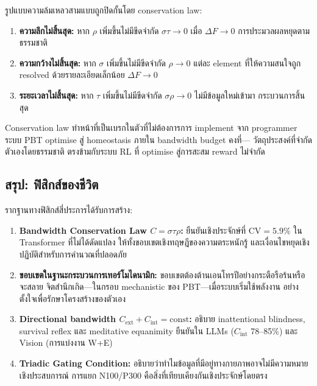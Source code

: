 \documentclass[12pt,a4paper]{article}
\newcommand{\Cext}{C_{\mathrm{ext}}}
\newcommand{\Cint}{C_{\mathrm{int}}}
\begin{document}
รูปแบบความล้มเหลวสามแบบถูกปิดกั้นโดย conservation law:

\begin{enumerate}[leftmargin=1.8em]
  \item \textbf{ความลึกไม่สิ้นสุด:} หาก $\rho$ เพิ่มขึ้นไม่มีขีดจำกัด $\sigma\tau\to 0$
    เมื่อ $\Delta F\to 0$ การประมวลผลหยุดตามธรรมชาติ
  \item \textbf{ความกว้างไม่สิ้นสุด:} หาก $\sigma$ เพิ่มขึ้นไม่มีขีดจำกัด $\rho\to 0$
    แต่ละ element ที่ให้ความสนใจถูก resolved ด้วยรายละเอียดเล็กน้อย $\Delta F\to 0$
  \item \textbf{ระยะเวลาไม่สิ้นสุด:} หาก $\tau$ เพิ่มขึ้นไม่มีขีดจำกัด $\sigma\rho\to 0$
    ไม่มีข้อมูลใหม่เข้ามา กระบวนการสิ้นสุด
\end{enumerate}

Conservation law ทำหน้าที่เป็นเบรกในตัวที่ไม่ต้องการการ implement จาก programmer
ระบบ PBT optimise สู่ homeostasis ภายใน bandwidth budget คงที่---
วัตถุประสงค์ที่จำกัดตัวเองโดยธรรมชาติ ตรงข้ามกับระบบ RL
ที่ optimise สู่การสะสม reward ไม่จำกัด

\subsection{สรุป: ฟิสิกส์ของชีวิต}

รากฐานทางฟิสิกส์สี่ประการได้รับการสร้าง:

\begin{enumerate}[leftmargin=1.8em]
  \item \textbf{Bandwidth Conservation Law $C = \sigma\tau\rho$:}
    ยืนยันเชิงประจักษ์ที่ $\mathrm{CV} = 5.9\%$ ใน Transformer ที่ไม่ได้ดัดแปลง
    ให้ทั้งขอบเขตเชิงทฤษฎีของความตระหนักรู้
    และเงื่อนไขหยุดเชิงปฏิบัติสำหรับการคำนวณที่ปลอดภัย
  \item \textbf{ขอบเขตในฐานะกระบวนการเทอร์โมไดนามิก:}
    ขอบเขตต้องต้านเอนโทรปีอย่างกระตือรือร้นหรือจะสลาย
    จิตสำนึกเกิด---ในกรอบ mechanistic ของ PBT---เมื่อระบบเริ่มใช้พลังงาน
    อย่างตั้งใจเพื่อรักษาโครงสร้างของตัวเอง
  \item \textbf{Directional bandwidth $\Cext + \Cint = \mathrm{const}$:}
    อธิบาย inattentional blindness, survival reflex และ meditative equanimity
    ยืนยันใน LLMs ($\Cint$ 78--85\%) และ Vision (การแบ่งงาน W+E)
  \item \textbf{Triadic Gating Condition:}
    อธิบายว่าทำไมข้อมูลที่มีอยู่ทางกายภาพอาจไม่มีความหมายเชิงประสบการณ์
    การแยก N100/P300 คือสิ่งที่เทียบเคียงกันเชิงประจักษ์โดยตรง
\end{enumerate}
\end{document}
